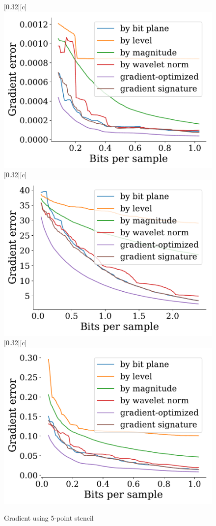 \documentclass{article}
\begin{document}
\begin{figure}[htb]
        [0.32\linewidth][c]{%
                \includegraphics[width=0.3\linewidth]{img/supplementary/gradient-optimized-karfs}}
        [0.32\linewidth][c]{%
                \includegraphics[width=0.3\linewidth]{img/supplementary/gradient-optimized-aneurism}}
        [0.32\linewidth][c]{%
                \includegraphics[width=0.3\linewidth]{img/supplementary/gradient-optimized-velocityz}}
        \caption{Gradient using 5-point stencil}
\end{figure}
\end{document}
